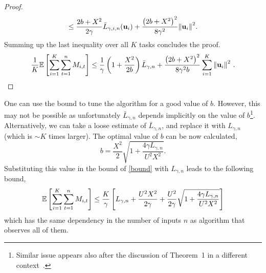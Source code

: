 \begin{proof}
\begin{equation}
\le \frac{2b+X^2}{2\gamma}{\bar L}_{\gamma,i,n}(\mathbf{u}_{i})+\frac{\left({2b+X^2}\right)^2}{8{\gamma}^2}{\left\Vert \mathbf{u}_{i} \right\Vert}^2.
\end{equation}
Summing up the last inequality over all $K$ tasks concludes the proof.
\begin{equation}
\begin{split}
\frac{1}{K}\mathbb{E}\left[ \sum_{i=1}^{K}\sum_{t=1}^{n}{M_{i,t}} \right]
\le\frac{1}{\gamma}\left(1+\frac{X^2}{2b} \right){\bar L}_{\gamma,n}+
\frac{\left({2b+X^2}\right)^2}{8{\gamma}^2b}\sum_{i=1}^{K}{{\left\Vert \mathbf{u}_{i} \right\Vert}^2}~.
\end{split}
\label{final_eq}
\end{equation}
\QED
\end{proof}

One can use the bound to tune the algorithm for a good  value of
$b$. However, this may not be possible as unfortunately ${\bar L}_{\gamma,n}$ depends
implicitly on the value of $b$\footnote{Similar issue appears also
  after the discussion of Theorem~1 in a different context~\cite{cesa2006worst}.}.
 Alternatively, we can take a
loose estimate of ${\bar L}_{\gamma,n}$, and replace it with
$L_{\gamma,n}$ (which is $\sim K$ times larger). The optimal value of
$b$ can be now calculated, 
\begin{displaymath}
b=\frac{X^2}{2}{\sqrt{1+\frac{4\gamma L_{\gamma,n}}{U^{2}X^2}}}.
\end{displaymath}
Substituting this value in the bound of \eqref{bound} with
$L_{\gamma,n}$ leads to the following bound, 
\begin{equation*}
\mathbb{E}\left[{\sum_{i=1}^{K}\sum_{t=1}^{n}{M_{i,t}}}\right]
\le\frac{K}{\gamma}\left[{L_{\gamma,n}+\frac{U^{2}X^2}{2\gamma}+\frac{U^{2}}{2\gamma}\sqrt{1+\frac{4\gamma L_{\gamma,n}}{U^{2}X^2}}}\right]
\end{equation*}
which has the same dependency in the number of inputs $n$ as algorithm
that observes all of them.


